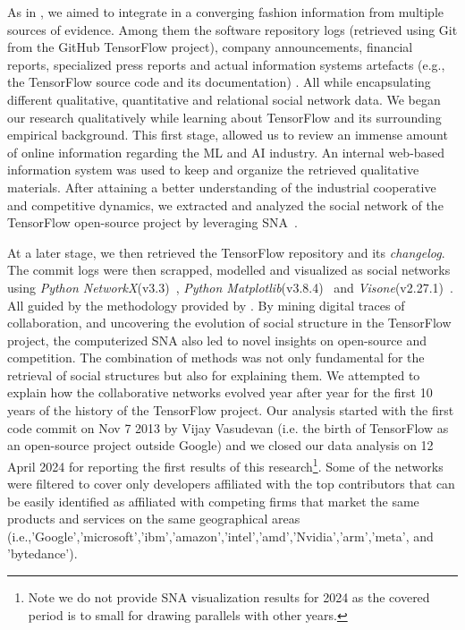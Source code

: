 \documentclass[CHICAGO,Times1COL]{WileyNJDv5} %
\begin{document}
As in \citet{TeixeiraMian_et_al2016}, we aimed to integrate in a converging fashion information from multiple sources of evidence. Among them the software repository logs
(retrieved using Git from the GitHub TensorFlow project), company announcements, financial reports, specialized press reports and actual information systems artefacts
(e.g., the
TensorFlow source code and its documentation) . All while encapsulating different qualitative, quantitative and relational social network  data. We began our research qualitatively while learning about TensorFlow and its surrounding empirical background. This first stage, allowed us to review an immense amount of online
information regarding the \ac{ML} and \ac{AI} industry. An internal web-based information system was used to keep and organize the
retrieved qualitative materials.
After attaining a better understanding of the industrial cooperative and competitive dynamics,  we extracted and analyzed the social network of the TensorFlow open-source
project by leveraging
SNA~\citep{wasserman_social_1994}. %



At a later stage, we then retrieved the TensorFlow repository and its \emph{changelog}. The commit logs were then scrapped, modelled and visualized as social networks
using \emph{Python NetworkX}(v3.3)~\citep[][]{HagbergSwart_et_al2008},  \emph{Python
Matplotlib}(v3.8.4)~\citep[][]{Hunter2007} and \emph{Visone}(v2.27.1)~\citep[][]{brandes2004analysis}. All guided by the methodology provided by \citet{teixeira2015lessons}.  By mining digital traces of collaboration, and uncovering the evolution of social structure in the
TensorFlow project, the computerized SNA also led to novel insights on open-source and competition. The combination of methods was not only fundamental for the retrieval
of social structures but also for explaining them. We attempted to explain how the collaborative networks evolved year after year for the first 10 years of the history of
the TensorFlow project. Our analysis started with the first code commit on Nov 7 2013 by Vijay Vasudevan (i.e. the birth of TensorFlow as an open-source project outside
Google) and we closed our data analysis on 12 April 2024 for reporting the first results of this research\footnote{Note we do not provide SNA visualization results for 2024 as the covered period is to small for drawing parallels with other years.}. Some of the networks were filtered to cover only developers
affiliated with the top contributors that can be easily identified as affiliated with competing firms that market the same products and services on the same geographical
areas
(i.e.,'Google','microsoft','ibm','amazon','intel','amd','Nvidia','arm','meta', and 'bytedance').
\end{document}
